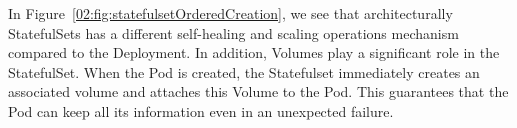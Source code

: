 \begin{enumerate}
    In Figure~\ref{02:fig:statefulsetOrderedCreation}, we see that architecturally StatefulSets has a different self-healing and scaling operations mechanism compared to the Deployment.
    In addition, Volumes play a significant role in the StatefulSet.
    When the Pod is created, the Statefulset immediately creates an associated volume and attaches this Volume to the Pod.
    This guarantees that the Pod can keep all its information even in an unexpected failure.

\end{enumerate}